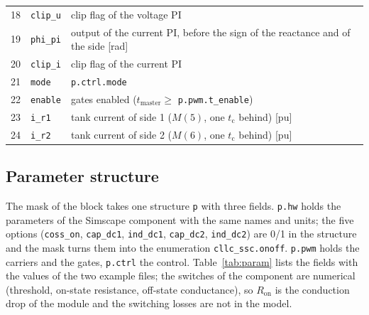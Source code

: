 \documentclass[12pt,a4paper]{scrartcl}
\newcommand{\ped}[1]{_{\mathrm{#1}}}
\newcommand{\code}[1]{\texttt{#1}}
\begin{document}
\begin{onehalfspace}
\begin{table}[H]
\begin{tabularx}{0.95\textwidth}{@{} c l X @{}}
		18 & \code{clip\_u} & clip flag of the voltage PI \\
		19 & \code{phi\_pi} & output of the current PI, before the sign of the reactance and of the side [\si{\radian}] \\
		20 & \code{clip\_i} & clip flag of the current PI \\
		21 & \code{mode} & \code{p.ctrl.mode} \\
		22 & \code{enable} & gates enabled ($t\ped{master} \ge$ \code{p.pwm.t\_enable}) \\
		23 & \code{i\_r1} & tank current of side 1 ($M(5)$, one $t\ped{c}$ behind) [pu] \\
		24 & \code{i\_r2} & tank current of side 2 ($M(6)$, one $t\ped{c}$ behind) [pu] \\
		\bottomrule
	\end{tabularx}
\end{table}

\subsection{Parameter structure}
\label{sec:param}

The mask of the block takes one structure \code{p} with three fields. \code{p.hw} holds the parameters of the Simscape component with the same names and units; the five options (\code{coss\_on}, \code{cap\_dc1}, \code{ind\_dc1}, \code{cap\_dc2}, \code{ind\_dc2}) are 0/1 in the structure and the mask turns them into the enumeration \code{cllc\_ssc.onoff}. \code{p.pwm} holds the carriers and the gates, \code{p.ctrl} the control. Table~\ref{tab:param} lists the fields with the values of the two example files; the switches of the component are numerical (threshold, on-state resistance, off-state conductance), so $R\ped{on}$ is the conduction drop of the module and the switching losses are not in the model.


\end{onehalfspace}
\end{document}
